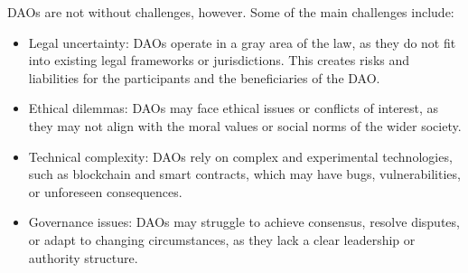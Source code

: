 \documentclass[lettersize,journal]{IEEEtran}
\begin{document}
DAOs are not without challenges, however. Some of the main challenges include:

\begin{itemize}
\item{Legal uncertainty: DAOs operate in a gray area of the law, as they do not fit into existing legal frameworks or jurisdictions. This creates risks and liabilities for the participants and the beneficiaries of the DAO.}
\item{Ethical dilemmas: DAOs may face ethical issues or conflicts of interest, as they may not align with the moral values or social norms of the wider society.}
\item{Technical complexity: DAOs rely on complex and experimental technologies, such as blockchain and smart contracts, which may have bugs, vulnerabilities, or unforeseen consequences.}
\item{Governance issues: DAOs may struggle to achieve consensus, resolve disputes, or adapt to changing circumstances, as they lack a clear leadership or authority structure.}
\end{itemize}








\end{document}
